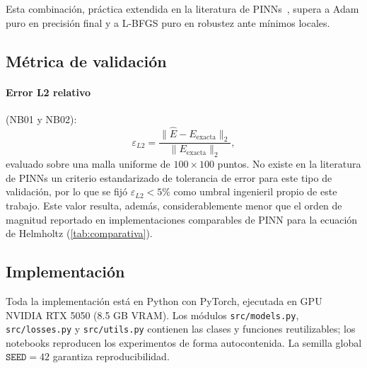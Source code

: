 Esta combinación, práctica extendida en la literatura de PINNs~\cite{Cuomo2022_review},
supera a Adam puro en precisión final y a L-BFGS puro en robustez ante mínimos locales.

\subsection{Métrica de validación}
\label{subsec:metricas}

\paragraph{Error L2 relativo} (NB01 y NB02):
%
\begin{equation}
  \varepsilon_{L2} = \frac{\|\hat{E} - E_{\mathrm{exacta}}\|_2}{\|E_{\mathrm{exacta}}\|_2},
  \label{eq:l2}
\end{equation}
%
evaluado sobre una malla uniforme de $100 \times 100$ puntos.
No existe en la literatura de PINNs un criterio estandarizado de tolerancia de error
para este tipo de validación, por lo que se fijó $\varepsilon_{L2} < 5\%$ como umbral
ingenieril propio de este trabajo. Este valor resulta, además, considerablemente menor
que el orden de magnitud reportado en implementaciones comparables de PINN para la
ecuación de Helmholtz (\cref{tab:comparativa}).

\subsection{Implementación}
\label{subsec:implementacion}

Toda la implementación está en Python con PyTorch, ejecutada en GPU NVIDIA RTX 5050
(8.5 GB VRAM).
Los módulos \texttt{src/models.py}, \texttt{src/losses.py} y \texttt{src/utils.py}
contienen las clases y funciones reutilizables; los notebooks reproducen los experimentos
de forma autocontenida.
La semilla global $\texttt{SEED} = 42$ garantiza reproducibilidad.
